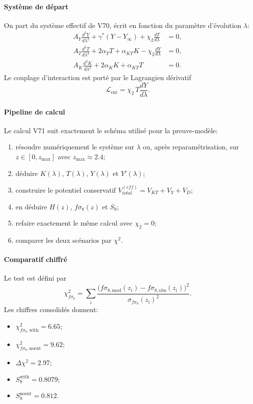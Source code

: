 \documentclass[11pt,a4paper]{article}
\newcommand{\Lent}{\mathcal{L}_{\mathrm{ent}}}
\begin{document}
\paragraph{Système de départ}
On part du système effectif de V70, écrit en fonction du paramètre d'évolution $\lambda$:
\[
\begin{aligned}
 A_Y\frac{d^2Y}{d\lambda^2}+\gamma^*(Y-Y_\infty)+\chi_2\frac{dT}{d\lambda} &= 0, \\
 A_T\frac{d^2T}{d\lambda^2}+2\alpha_T T+\alpha_{KT}K-\chi_2\frac{dY}{d\lambda} &= 0, \\
 A_K\frac{d^2K}{d\lambda^2}+2\alpha_K K+\alpha_{KT}T &= 0.
\end{aligned}
\]
Le couplage d'interaction est porté par le Lagrangien dérivatif
\[
\Lent=\chi_2\,T\frac{dY}{d\lambda}.
\]

\paragraph{Pipeline de calcul}
Le calcul V71 suit exactement le schéma utilisé pour la preuve-modèle:
\begin{enumerate}
	\item résoudre numériquement le système sur $\lambda$ ou, après reparamétrisation, sur $z \in [0,z_{\max}]$ avec $z_{\max}\approx 2.4$;
	\item déduire $K(\lambda)$, $T(\lambda)$, $Y(\lambda)$ et $Y'(\lambda)$;
	\item construire le potentiel conservatif $V_{total}^{(eff)}=V_{KT}+V_Y+V_D$;
	\item en déduire $H(z)$, $f\sigma_8(z)$ et $S_8$;
	\item refaire exactement le même calcul avec $\chi_2=0$;
	\item comparer les deux scénarios par $\chi^2$.
\end{enumerate}

\paragraph{Comparatif chiffré}
Le test est défini par
\[
\chi^2_{f\sigma_8}=\sum_i \frac{\big(f\sigma_{8,\mathrm{mod}}(z_i)-f\sigma_{8,\mathrm{obs}}(z_i)\big)^2}{\sigma_{f\sigma_8}(z_i)^2}.
\]
Les chiffres consolidés donnent:
\begin{itemize}
	\item $\chi^2_{f\sigma_8,\mathrm{with}}=6.65$;
	\item $\chi^2_{f\sigma_8,\mathrm{noent}}=9.62$;
	\item $\Delta\chi^2=2.97$;
	\item $S_8^{\mathrm{with}}=0.8079$;
	\item $S_8^{\mathrm{noent}}=0.812$.
\end{itemize}
\end{document}
